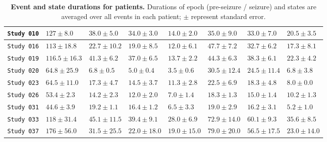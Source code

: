 \begin{table}[H]
\begin{tabular}{|x{2cm}|x{2.0cm}|x{1.0cm}|x{1.0cm}|x{1.0cm}|x{1.0cm}|x{1.0cm}|x{1.0cm}|}
        \verb|Study 010|     & $127\pm8.0$ & $38.0\pm5.0$ & $34.0\pm3.0$ & $14.0\pm2.0$ & $35.0\pm9.0$ & $33.0\pm7.0$ & $20.5\pm3.5$\\ \hline
        \verb|Study 016|     & $113\pm18.8$ & $22.7\pm10.2$ & $19.0\pm8.5$ & $12.0\pm6.1$ & $47.7\pm7.2$ & $32.7\pm6.2$ & $17.3\pm8.1$\\ \hline
        \verb|Study 019|     & $116.5\pm16.3$ & $41.3\pm6.2$ & $37.0\pm6.5$ & $13.7\pm2.2$ & $44.3\pm6.3$ & $38.3\pm6.1$ & $22.3\pm4.2$\\ \hline
        \verb|Study 020|     & $64.8\pm25.9$ & $6.8\pm0.5$ & $5.0\pm0.4$ & $3.5\pm0.6$ & $30.5\pm12.4$ & $24.5\pm11.4$ & $6.8\pm3.8$\\ \hline
        \verb|Study 023|     & $64.5\pm11.0$ & $17.3\pm4.7$ & $14.5\pm3.7$ & $11.3\pm2.8$ & $22.5\pm6.9$ & $18.3\pm4.8$ & $8.0\pm0.0$\\ \hline
        \verb|Study 026|     & $53.4\pm2.3$ & $14.2\pm2.3$ & $12.0\pm2.0$ & $7.0\pm1.4$ & $18.3\pm1.3$ & $15.0\pm1.4$ & $10.2\pm1.3$\\ \hline
        \verb|Study 031|     & $44.6\pm3.9$ & $19.2\pm1.1$ & $16.4\pm1.2$ & $6.5\pm3.3$ & $19.0\pm2.9$ & $16.2\pm3.1$ & $5.2\pm1.0$\\ \hline
        \verb|Study 033|     & $118\pm31.4$ & $45.1\pm11.5$ & $39.4\pm9.1$ & $28.0\pm6.9$ & $72.9\pm14.0$ & $60.1\pm9.3$ & $35.6\pm8.5$\\ \hline
        \verb|Study 037|     & $176\pm56.0$ & $31.5\pm25.5$ & $22.0\pm18.0$ & $19.0\pm15.0$ & $79.0\pm20.0$ & $56.5\pm17.5$ & $23.0\pm14.0$\\ \hline
    \end{tabular}
    \caption[Event and state durations for patients]{\textbf{Event and state durations for patients.} Durations of epoch (pre-seizure / seizure) and states are averaged over all events in each patient; $\pm$ represent standard error.\label{ch3:tabS1}}
\end{table}

